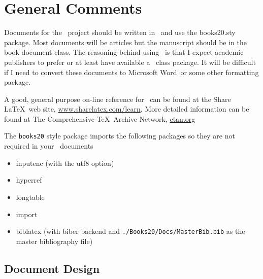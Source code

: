 
\section{General Comments}

Documents for the \ProjectTitle\ project should be written in \LaTeXe\ and use
the books20.sty package. Most documents will be articles but the
manuscript should be in the book document class. The reasoning behind
using \LaTeXe\ is that I expect academic publishers to prefer or at
least have available a \LaTeXe\ class package.  It will be difficult if
I need to convert these documents to Microsoft Word\texttrademark\ or
some other formatting package.

A good, general purpose on-line reference for \LaTeXe\ can be found at
the Share \LaTeX\ web site,
\href{http://www.sharelatex.com/learn}{www.sharelatex.com/learn}.
More detailed information can be found at The Comprehensive
\TeX\ Archive Network, \href{ctan.org}{ctan.org}

The \texttt{books20} style package imports the following packages so they are
not required in your \LaTeXe\ documents

\begin{itemize}
\item inputenc \cite{Jeffrey2018} (with the utf8 option)
\item hyperref \cite{Rahtz2017}
\item longtable \cite{Carlisle2014}
\item import \cite{Arseneau2009}
\item biblatex \cite{Lehman2018} (with biber backend and
  \texttt{./Books20/Docs/MasterBib.bib} as the master bibliography file)
\end{itemize}


\subsection{Document Design}

